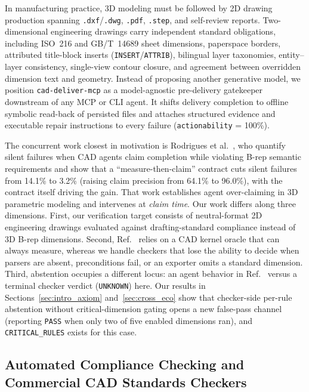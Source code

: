 \documentclass[nocopyright,nolists,upint,varvw,hyphenate]{asmejour}
\begin{document}
In manufacturing practice, 3D modeling must be followed by 2D drawing production spanning \texttt{.dxf}/\texttt{.dwg}, \texttt{.pdf}, \texttt{.step}, and self-review reports. Two-dimensional engineering drawings carry independent standard obligations, including ISO~216 and GB/T~14689 sheet dimensions, paperspace borders, attributed title-block inserts (\texttt{INSERT}/\texttt{ATTRIB}), bilingual layer taxonomies, entity--layer consistency, single-view contour closure, and agreement between overridden dimension text and geometry. Instead of proposing another generative model, we position \texttt{cad-deliver-mcp} as a model-agnostic pre-delivery gatekeeper downstream of any MCP or CLI agent. It shifts delivery completion to offline symbolic read-back of persisted files and attaches structured evidence and executable repair instructions to every failure (\texttt{actionability} = 100\%).

The concurrent work closest in motivation is Rodrigues et al.~\cite{rodrigues2026done}, who quantify silent failures when CAD agents claim completion while violating B-rep semantic requirements and show that a ``measure-then-claim'' contract cuts silent failures from 14.1\% to 3.2\% (raising claim precision from 64.1\% to 96.0\%), with the contract itself driving the gain. That work establishes agent over-claiming in 3D parametric modeling and intervenes at \emph{claim time}. Our work differs along three dimensions. First, our verification target consists of neutral-format 2D engineering drawings evaluated against drafting-standard compliance instead of 3D B-rep dimensions. Second, Ref.~\cite{rodrigues2026done} relies on a CAD kernel oracle that can always measure, whereas we handle checkers that lose the ability to decide when parsers are absent, preconditions fail, or an exporter omits a standard dimension. Third, abstention occupies a different locus: an agent behavior in Ref.~\cite{rodrigues2026done} versus a terminal checker verdict (\texttt{UNKNOWN}) here. Our results in Sections~\ref{sec:intro_axiom} and~\ref{sec:cross_eco} show that checker-side per-rule abstention without critical-dimension gating opens a new false-pass channel (reporting \texttt{PASS} when only two of five enabled dimensions ran), and \texttt{CRITICAL\_RULES} exists for this case.

\subsection{Automated Compliance Checking and Commercial CAD Standards Checkers}
\end{document}
